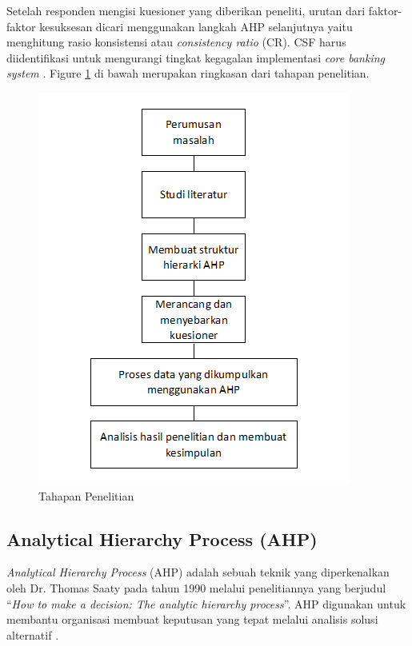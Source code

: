\documentclass[journal,article,submit,pdftex,moreauthors]{Definitions/mdpi}
\begin{document}
Setelah responden mengisi kuesioner yang diberikan peneliti, urutan dari faktor-faktor kesuksesan dicari menggunakan langkah AHP selanjutnya yaitu menghitung rasio konsistensi atau \textit{consistency ratio} (CR). CSF harus diidentifikasi untuk mengurangi tingkat kegagalan implementasi \textit{core banking system} \cite{aggestam2023apply}. Figure \ref{fig:tahapan} di bawah merupakan ringkasan dari tahapan penelitian.

\begin{figure}[H]
\includegraphics[width=6 cm]{attachments/tahapan.png}
\caption{Tahapan Penelitian \label{fig:tahapan}}
\end{figure}   

\subsection{Analytical Hierarchy Process (AHP)}
\textit{Analytical Hierarchy Process} (AHP) adalah sebuah teknik yang diperkenalkan oleh Dr. Thomas Saaty pada tahun 1990 melalui penelitiannya yang berjudul “\textit{How to make a decision: The analytic hierarchy process}”. AHP digunakan untuk membantu organisasi membuat keputusan yang tepat melalui analisis solusi alternatif \cite{Jacob2021}. 
\end{document}
